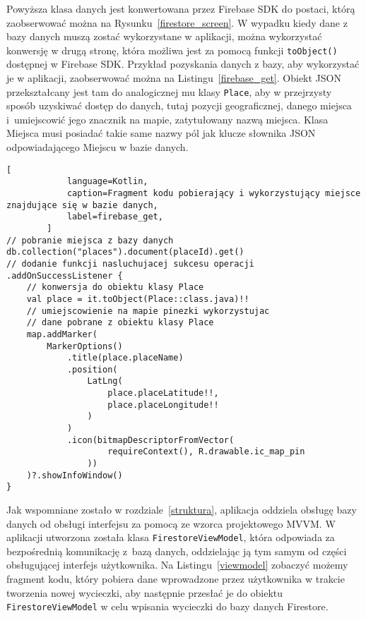         Powyższa klasa danych jest konwertowana przez Firebase SDK do postaci, którą zaobserwować można na Rysunku~\ref{firestore_screen}. W wypadku kiedy dane z bazy danych muszą zostać wykorzystane
        w aplikacji, można wykorzystać konwersję w drugą stronę, która możliwa jest za pomocą funkcji \texttt{toObject()} dostępnej w Firebase SDK. Przykład pozyskania danych z bazy, aby wykorzystać je w
        aplikacji, zaobserwować można na Listingu~\ref{firebase_get}. Obiekt JSON przekształcany jest tam do analogicznej mu klasy \texttt{Place}, aby w przejrzysty sposób uzyskiwać dostęp do danych, tutaj
        pozycji geograficznej, danego miejsca i~umiejscowić jego znacznik na mapie, zatytułowany nazwą miejsca. Klasa Miejsca musi posiadać takie same nazwy pól jak klucze słownika JSON odpowiadającego
        Miejscu w bazie danych.

\newpage
        \begin{lstlisting}[
            language=Kotlin, 
            caption=Fragment kodu pobierający i wykorzystujący miejsce znajdujące się w bazie danych, 
            label=firebase_get,
        ]
// pobranie miejsca z bazy danych
db.collection("places").document(placeId).get()
// dodanie funkcji nasluchujacej sukcesu operacji
.addOnSuccessListener {
    // konwersja do obiektu klasy Place
    val place = it.toObject(Place::class.java)!!
    // umiejscowienie na mapie pinezki wykorzystujac 
    // dane pobrane z obiektu klasy Place
    map.addMarker(
        MarkerOptions()
            .title(place.placeName)
            .position(
                LatLng(
                    place.placeLatitude!!, 
                    place.placeLongitude!!
                )
            )
            .icon(bitmapDescriptorFromVector(
                    requireContext(), R.drawable.ic_map_pin
                ))
    )?.showInfoWindow()
}
        \end{lstlisting}
        \vspace{0.5cm}

        Jak wspomniane zostało w rozdziale~\ref{struktura}, aplikacja oddziela obsługę bazy danych od obsługi interfejsu za pomocą ze wzorca projektowego MVVM. W aplikacji utworzona została
        klasa \texttt{FirestoreViewModel}, która odpowiada za bezpośrednią komunikację z~bazą danych, oddzielając ją tym samym od części obsługującej interfejs użytkownika. Na Listingu~\ref{viewmodel}
        zobaczyć możemy fragment kodu, który pobiera dane wprowadzone przez użytkownika w trakcie tworzenia nowej wycieczki, aby następnie przesłać je do obiektu \texttt{FirestoreViewModel} w celu wpisania wycieczki
        do bazy danych Firestore.

